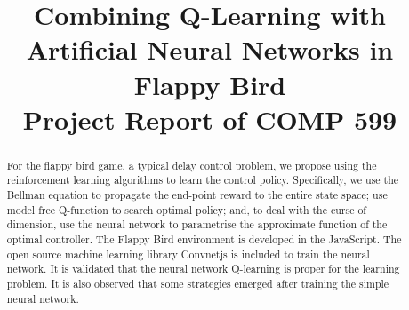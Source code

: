\documentclass[conference,compsoc]{IEEEtran}
\begin{document}
%
\title{Combining Q-Learning with Artificial Neural Networks in Flappy Bird
\\ Project Report of COMP 599}


\author{
\and
{}
}
\maketitle

\begin{abstract}
For the flappy bird game, a typical delay control problem, we propose using the reinforcement learning algorithms to learn the control policy. Specifically, we use the Bellman equation to propagate the end-point reward to the entire state space; use model free Q-function to search optimal policy; and, to deal with the curse of dimension, use the neural network to parametrise the approximate function of the optimal controller. The Flappy Bird environment is developed in the JavaScript. The open source machine learning library Convnetjs is included to train the neural network. It is validated that the neural network Q-learning is proper for the learning problem. It is also observed that some strategies emerged after training the simple neural network.
\end{abstract}





%
\IEEEpeerreviewmaketitle
\end{document}
